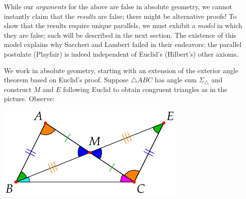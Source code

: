 While our \emph{arguments} for the above are false in absolute geometry, we cannot instantly claim that the \emph{results} are false; there might be alternative proofs! To show that the results require unique parallels, we must exhibit a \emph{model} in which they are false; such will be described in the next section. The existence of this model explains why Saccheri and Lambert failed in their endeavors: the parallel postulate (Playfair) is indeed independent of Euclid's (Hilbert's) other axioms.
\goodbreak



\begin{minipage}[t]{0.62\linewidth}\vspace{0pt}

We work in absolute geometry, starting with an extension of the exterior angle theorem based on Euclid's proof.\smallbreak
Suppose $\triangle ABC$ has angle sum $\Sigma_\triangle$ and construct $M$ and $E$ following Euclid to obtain congruent triangles as in the picture. Observe:
\end{minipage}\hfill\begin{minipage}[t]{0.36\linewidth}\vspace{0pt}
\flushright\includegraphics{history-saccheri}
\end{minipage}


